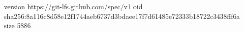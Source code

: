 version https://git-lfs.github.com/spec/v1
oid sha256:8a116c8d58e12f1744aeb6737d3bdaee17f7d61485e72333b18722c3438fff6a
size 5886
